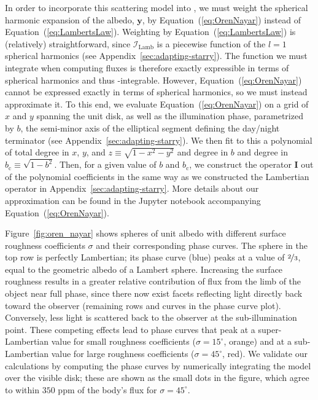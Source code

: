 \documentclass[modern]{aastex62}
\begin{document}
In order to incorporate this scattering model into \starry, we must weight
the spherical harmonic expansion of the albedo, $\mathbf{y}$, by
Equation~(\ref{eq:OrenNayar}) instead of Equation~(\ref{eq:LambertsLaw}).
Weighting by Equation~(\ref{eq:LambertsLaw}) is (relatively) straightforward,
since $\mathcal{I}_\text{Lamb}$ is a piecewise function of the $l=1$ spherical
harmonics (see Appendix~\ref{sec:adapting-starry}).
The function we must integrate when computing fluxes is therefore
exactly expressible in terms of spherical harmonics and thus
\starry-integrable. However, Equation~(\ref{eq:OrenNayar}) cannot be expressed
exactly in terms of spherical harmonics, so we must instead approximate it.
To this end, we evaluate Equation~(\ref{eq:OrenNayar}) on a
grid of $x$ and $y$ spanning the unit disk, as well as the illumination phase,
parametrized by $b$, the semi-minor axis of the elliptical segment defining
the day/night terminator (see Appendix~\ref{sec:adapting-starry}).
We then fit to this a polynomial of total degree \STARRYORENNAYARDEG
in $x$, $y$, and $z \equiv \sqrt{1 - x^2 - y^2}$ and degree
\STARRYORENNAYARNB in $b$ and degree \STARRYORENNAYARNBC in
$b_\mathrm{c} \equiv \sqrt{1 - b^2}$.
%
Then, for a given value of $b$ and $b_\mathrm{c}$, we construct the operator
$\mathbf{I}$ out of the polynomial coefficients in the same way as we
constructed the Lambertian operator in Appendix~\ref{sec:adapting-starry}.
%
More details about our approximation can be found in the Jupyter notebook
accompanying Equation~(\ref{eq:OrenNayar}).

Figure~\ref{fig:oren_nayar} shows spheres of unit albedo
with different surface roughness
coefficients $\sigma$ and their corresponding phase curves.
The sphere in the top row is perfectly Lambertian; its phase curve (blue)
peaks at a value of $\nicefrac{2}{3}$, equal to the geometric albedo
of a Lambert sphere. Increasing the surface roughness results in a greater
relative contribution of flux from the limb of the object near full
phase, since there now exist facets reflecting light directly back toward the
observer (remaining rows and curves in the phase curve plot).
Conversely, less light is scattered
back to the observer at the
sub-illumination point. These competing effects lead to phase curves that
peak at a super-Lambertian value for small roughness
coefficients ($\sigma = 15^\circ$, orange) and at a sub-Lambertian value for
large roughness coefficients ($\sigma = 45^\circ$, red).
%
We validate our calculations by computing the phase curves by numerically
integrating the \citet{OrenNayar1994} model over the visible disk; these
are shown as the small dots in the figure, which agree to within
$350$ ppm of the body's flux for $\sigma = 45^\circ$.
\end{document}
